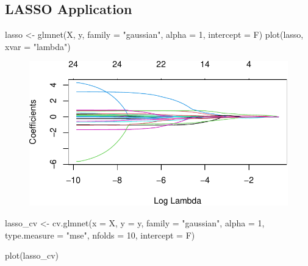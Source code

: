 \documentclass[
  letterpaper,
  DIV=11,
  numbers=noendperiod]{scrreport}
\newenvironment{Shaded}{\begin{snugshade}}{\end{snugshade}}
\newcommand{\AttributeTok}[1]{\textcolor[rgb]{0.40,0.45,0.13}{#1}}
\newcommand{\DecValTok}[1]{\textcolor[rgb]{0.68,0.00,0.00}{#1}}
\newcommand{\FunctionTok}[1]{\textcolor[rgb]{0.28,0.35,0.67}{#1}}
\newcommand{\NormalTok}[1]{\textcolor[rgb]{0.00,0.23,0.31}{#1}}
\newcommand{\OtherTok}[1]{\textcolor[rgb]{0.00,0.23,0.31}{#1}}
\newcommand{\StringTok}[1]{\textcolor[rgb]{0.13,0.47,0.30}{#1}}
\begin{document}
\hypertarget{lasso-application}{%
\subsection{LASSO Application}\label{lasso-application}}

\begin{Shaded}
\begin{Highlighting}[]
\NormalTok{lasso }\OtherTok{\textless{}{-}} \FunctionTok{glmnet}\NormalTok{(X, y, }\AttributeTok{family =} \StringTok{"gaussian"}\NormalTok{, }\AttributeTok{alpha =} \DecValTok{1}\NormalTok{, }\AttributeTok{intercept =}\NormalTok{ F)}
\FunctionTok{plot}\NormalTok{(lasso, }\AttributeTok{xvar =} \StringTok{"lambda"}\NormalTok{)}
\end{Highlighting}
\end{Shaded}

\begin{figure}[H]

{\centering \includegraphics{week5/week5_files/figure-pdf/unnamed-chunk-14-1.pdf}

}

\end{figure}

\begin{Shaded}
\begin{Highlighting}[]
\NormalTok{lasso\_cv }\OtherTok{\textless{}{-}} \FunctionTok{cv.glmnet}\NormalTok{(}\AttributeTok{x =}\NormalTok{ X, }\AttributeTok{y =}\NormalTok{ y, }\AttributeTok{family =} \StringTok{"gaussian"}\NormalTok{, }\AttributeTok{alpha =} \DecValTok{1}\NormalTok{,}
                      \AttributeTok{type.measure =} \StringTok{"mse"}\NormalTok{, }\AttributeTok{nfolds =} \DecValTok{10}\NormalTok{, }\AttributeTok{intercept =}\NormalTok{ F)}

\FunctionTok{plot}\NormalTok{(lasso\_cv)}
\end{Highlighting}
\end{Shaded}
\end{document}

